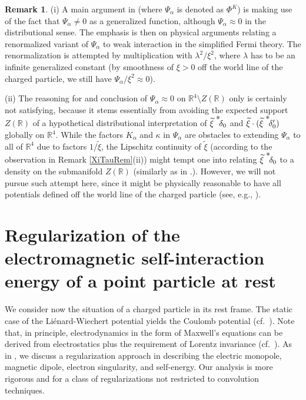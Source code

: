 \documentclass[sumlimits,intlimits,namelimits%
]{amsart}
\newcommand{\mb}[1]{\ensuremath{\mathbb{#1}}}
\newcommand{\R}{\mb{R}}
\theoremstyle{definition}
\newtheorem{remark}[theorem]{Remark}
\newcommand{\al}{\alpha}
\newcommand{\de}{\delta}
\newcommand{\la}{\lambda}
\newcommand{\xip}{\widetilde{\xi}^{\,\,\raisebox{0.3ex}{*}}\!}
\begin{document}
\begin{remark} (i) A main argument in \cite[Sections 4 and 5]{GEW}  (where $\Psi_\al$ is denoted as $\Phi^K$) is making use of the fact that $\Psi_\al \neq 0$ as a generalized function, although $\Psi_\al \approx 0$ in the distributional sense. The emphasis is then on physical arguments relating a renormalized variant of $\Psi_\al$ to weak interaction in the simplified Fermi theory. The renormalization is attempted by multiplication with $\la^2/\xi^2$, where $\la$ has to be an infinite generalized constant (by smoothness of $\xi > 0$ off the world line of the charged particle, we still have $\Psi_\al/\xi^2 \approx 0$).

(ii) The reasoning for and conclusion of $\Psi_\al \approx 0$ on $\R^4 \setminus Z(\R)$ only is certainly not satisfying, because it stems essentially from avoiding the expected support $Z(\R)$ of a hypothetical distributional interpretation of $\xip \de_0$ and $\widetilde{\xi} \cdot (\xip\de_0')$ globally on $\R^4$. While the factors $K_\al$ and $\kappa$ in $\Psi_\al$ are obstacles to extending $\Psi_\al$ to all of $\R^4$ due to factors $1/\widetilde{\xi}$, the Lipschitz continuity of $\widetilde{\xi}$ (according to the observation in Remark \ref{XiTauRem}(ii)) might tempt one into relating $\xip \de_0$ to a density on the submanifold $Z(\R)$ (similarly as in \cite[Theorem 6.1.5]{Hoermander:V1}.). However, we will not pursue such attempt here, since it might be physically reasonable to have all potentials defined off the world line of the charged particle (see, e.g., \cite[(8.3.1)]{Thirring:01}).

\end{remark}

\section{Regularization of the electromagnetic self-interaction energy of a point particle at rest}\label{SecSelf}

We consider now the situation of a charged particle in its rest frame. The static case of the Li\'{e}nard-Wiechert potential yields the Coulomb potential (cf.\ \cite[(8.2.17) and (8.2.18)]{Thirring:01}). Note that, in principle, electrodynamics in the form of Maxwell's equations can be derived from electrostatics plus the requirement of Lorentz invariance (cf.\ \cite{Scharf}). 
As in \cite{GsponerJMP}, we discuss a regularization approach in describing the electric monopole, magnetic dipole, electron singularity, and self-energy. Our analysis is more rigorous and for a class of regularizations not restricted to convolution techniques.
\end{document}
